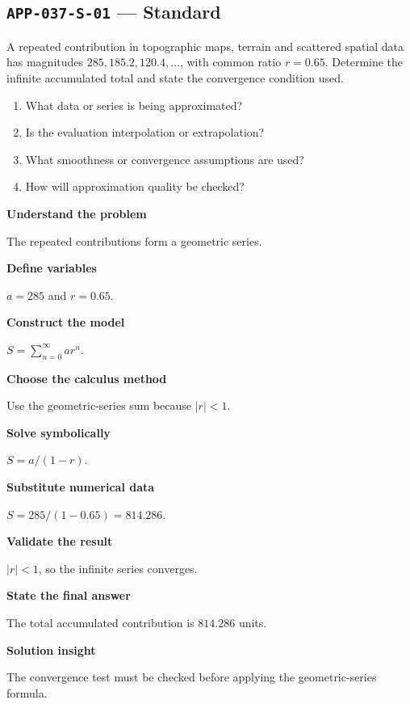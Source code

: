 \documentclass[11pt]{book}
\newcommand{\pid}[1]{\texttt{#1}}
\begin{document}
\subsection*{\pid{APP-037-S-01} — Standard}
\begin{problembox}
A repeated contribution in topographic maps, terrain and scattered spatial data has magnitudes $285, 185.2, 120.4,\ldots$, with common ratio $r=0.65$. Determine the infinite accumulated total and state the convergence condition used.
\end{problembox}
\begin{promptbox}\begin{enumerate}
\item What data or series is being approximated?
\item Is the evaluation interpolation or extrapolation?
\item What smoothness or convergence assumptions are used?
\item How will approximation quality be checked?
\end{enumerate}\end{promptbox}
\begin{solutionbox}
\textbf{Understand the problem}\par The repeated contributions form a geometric series.\par\medskip
\textbf{Define variables}\par $a=285$ and $r=0.65$.\par\medskip
\textbf{Construct the model}\par $S=\sum_{n=0}^{\infty}ar^n$.\par\medskip
\textbf{Choose the calculus method}\par Use the geometric-series sum because $|r|<1$.\par\medskip
\textbf{Solve symbolically}\par $S=a/(1-r)$.\par\medskip
\textbf{Substitute numerical data}\par $S=285/(1-0.65)=814.286$.\par\medskip
\textbf{Validate the result}\par $|r|<1$, so the infinite series converges.\par\medskip
\textbf{State the final answer}\par The total accumulated contribution is $814.286$ units.\par\medskip
\textbf{Solution insight}\par The convergence test must be checked before applying the geometric-series formula.\par\medskip
\end{solutionbox}
\end{document}
